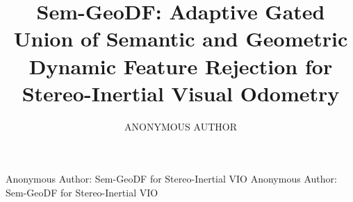 \documentclass{ieeeaccess}
\begin{document}

\title{Sem-GeoDF: Adaptive Gated Union of Semantic and Geometric Dynamic Feature Rejection for Stereo-Inertial Visual Odometry}

\author{\uppercase{Anonymous Author}}

\address[1]{Affiliation withheld pending author list finalization (IEEE Access submission draft).}


\markboth
{Anonymous Author: Sem-GeoDF for Stereo-Inertial VIO}
{Anonymous Author: Sem-GeoDF for Stereo-Inertial VIO}

\end{document}
